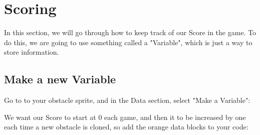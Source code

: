 \section{Scoring}
In this section, we will go through how to keep track of our Score in the game. To do this, we are going to use something called a "Variable", which is just a way to store information.

\subsection{Make a new Variable}
Go to to your obstacle sprite, and in the Data section, select "Make a Variable":

We want our Score to start at 0 each game, and then it to be increased by one each time a new obstacle is cloned, so add the orange data blocks to your code:

